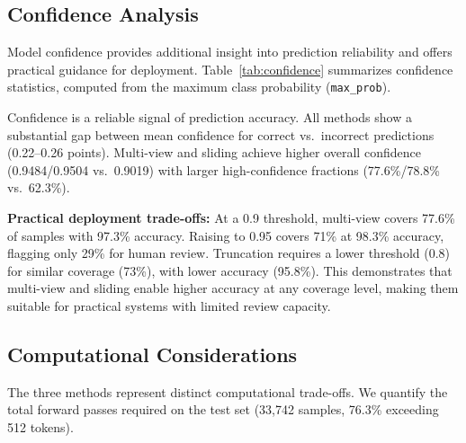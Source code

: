 \documentclass[conference]{IEEEtran}
\begin{document}
\subsection{Confidence Analysis}

Model confidence provides additional insight into prediction reliability and offers practical guidance for deployment. Table~\ref{tab:confidence} summarizes confidence statistics, computed from the maximum class probability (\texttt{max\_prob}).

\begin{table}[htbp]
  \centering
  \caption{Confidence analysis on the held-out test set.}
  \label{tab:confidence}
  \footnotesize
  \setlength{\tabcolsep}{2pt}
\end{table}

Confidence is a reliable signal of prediction accuracy. All methods show a substantial gap between mean confidence for correct vs.\ incorrect predictions (0.22--0.26 points). Multi-view and sliding achieve higher overall confidence (0.9484/0.9504 vs.\ 0.9019) with larger high-confidence fractions (77.6\%/78.8\% vs.\ 62.3\%).

\textbf{Practical deployment trade-offs:} At a 0.9 threshold, multi-view covers 77.6\% of samples with 97.3\% accuracy. Raising to 0.95 covers 71\% at 98.3\% accuracy, flagging only 29\% for human review. Truncation requires a lower threshold (0.8) for similar coverage (73\%), with lower accuracy (95.8\%). This demonstrates that multi-view and sliding enable higher accuracy at any coverage level, making them suitable for practical systems with limited review capacity.

\subsection{Computational Considerations}

The three methods represent distinct computational trade-offs. We quantify the total forward passes required on the test set (33,742 samples, 76.3\% exceeding 512 tokens).
\end{document}
